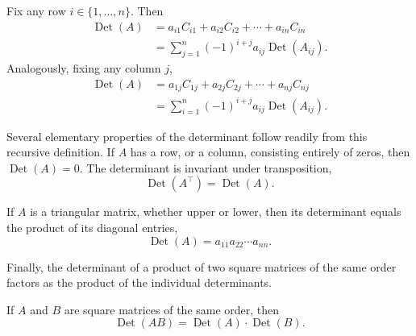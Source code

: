 \begin{theorem}
Fix any row $i \in \{1, \dots, n\}$. Then
\[
\begin{aligned}
\operatorname{Det}(A) &= a_{i1} C_{i1} + a_{i2} C_{i2} + \cdots + a_{in} C_{in} \\
&= \sum_{j=1}^{n} (-1)^{i+j} a_{ij} \operatorname{Det}(A_{ij}).
\end{aligned}
\]
Analogously, fixing any column $j$,
\[
\begin{aligned}
\operatorname{Det}(A) &= a_{1j} C_{1j} + a_{2j} C_{2j} + \cdots + a_{nj} C_{nj} \\
&= \sum_{i=1}^{n} (-1)^{i+j} a_{ij} \operatorname{Det}(A_{ij}).
\end{aligned}
\]

\end{theorem}

Several elementary properties of the determinant follow readily from this recursive definition. If $A$ has a row, or a column, consisting entirely of zeros, then $\operatorname{Det}(A) = 0$. The determinant is invariant under transposition,
\[
\operatorname{Det}(A^{\top}) = \operatorname{Det}(A).
\]

If $A$ is a triangular matrix, whether upper or lower, then its determinant equals the product of its diagonal entries,
\[
\operatorname{Det}(A) = a_{11} a_{22} \cdots a_{nn}.
\]

Finally, the determinant of a product of two square matrices of the same order factors as the product of the individual determinants.

\begin{theorem}
If $A$ and $B$ are square matrices of the same order, then
\[
\operatorname{Det}(AB) = \operatorname{Det}(A) \cdot \operatorname{Det}(B).
\]

\end{theorem}

